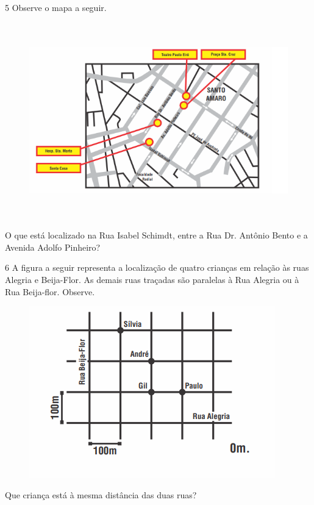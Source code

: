 {{{{\num{5}  Observe o mapa a seguir.

\begin{figure}[H]
\centering\includegraphics[width=5.90625in,height=3.34375in]{./imgSAEB_6_MAT/media/image68.png}
\end{figure}

O que está localizado na Rua Isabel Schimdt, entre a Rua Dr. Antônio Bento e a Avenida
Adolfo Pinheiro?


\num{6}  A figura a seguir representa a localização de quatro crianças em relação às
ruas Alegria e Beija-Flor. As demais ruas traçadas são paralelas à Rua
Alegria ou à Rua Beija-flor. Observe.

\begin{figure}[H]
\centering\includegraphics[width=4.19792in,height=2.93056in]{./imgSAEB_6_MAT/media/image69.png}
\end{figure}

Que criança está à mesma distância das duas ruas?

}}}}
